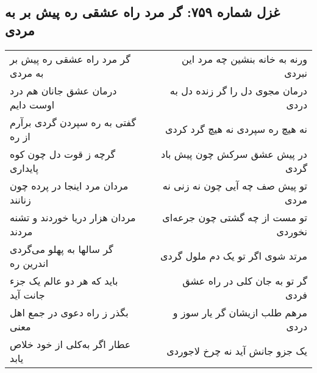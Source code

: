 \begin{center}
\section*{غزل شماره ۷۵۹: گر مرد راه عشقی ره پیش بر به مردی}
\label{sec:759}
\begin{longtable}{l p{0.5cm} r}
گر مرد راه عشقی ره پیش بر به مردی
&&
ورنه به خانه بنشین چه مرد این نبردی
\\
درمان عشق جانان هم درد اوست دایم
&&
درمان مجوی دل را گر زنده دل به دردی
\\
گفتی به ره سپردن گردی برآرم از ره
&&
نه هیچ ره سپردی نه هیچ گرد کردی
\\
گرچه ز قوت دل چون کوه پایداری
&&
در پیش عشق سرکش چون پیش باد گردی
\\
مردان مرد اینجا در پرده چون زنانند
&&
تو پیش صف چه آیی چون نه زنی نه مردی
\\
مردان هزار دریا خوردند و تشنه مردند
&&
تو مست از چه گشتی چون جرعه‌ای نخوردی
\\
گر سالها به پهلو می‌گردی اندرین ره
&&
مرتد شوی اگر تو یک دم ملول گردی
\\
باید که هر دو عالم یک جزء جانت آید
&&
گر تو به جان کلی در راه عشق فردی
\\
بگذر ز راه دعوی در جمع اهل معنی
&&
مرهم طلب ازیشان گر یار سوز و دردی
\\
عطار اگر به‌کلی از خود خلاص یابد
&&
یک جزو جانش آید نه چرخ لاجوردی
\\
\end{longtable}
\end{center}
